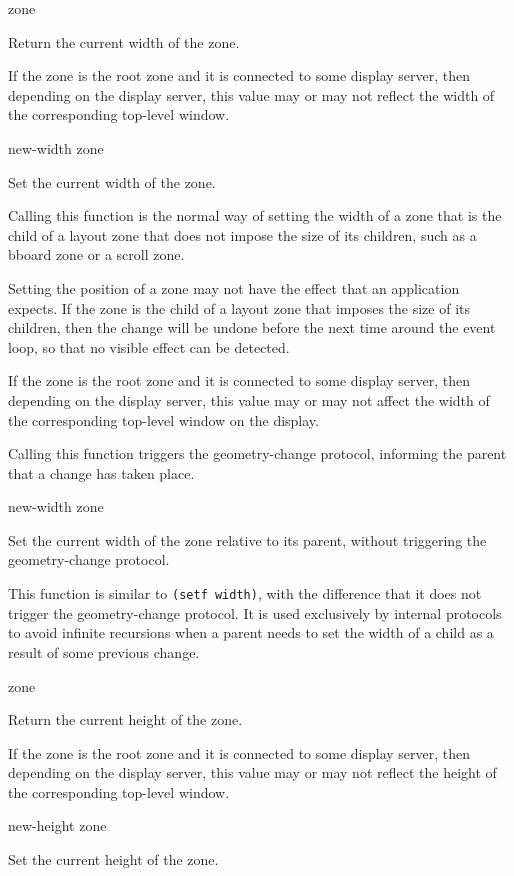  {zone}

Return the current width of the zone.  

If the zone is the root zone and it is connected to some display
server, then depending on the display server, this value may or
may not reflect the width of the corresponding top-level window.

 {new-width zone}

Set the current width of the zone.

Calling this function is the normal way of setting the width of a
zone that is the child of a layout zone that does not impose the
size of its children, such as a bboard zone or a scroll zone.

Setting the position of a zone may not have the effect that an
application expects.  If the zone is the child of a layout zone
that imposes the size of its children, then the change will be
undone before the next time around the event loop, so that no
visible effect can be detected.

If the zone is the root zone and it is connected to some display
server, then depending on the display server, this value may or
may not affect the width of the corresponding top-level window
on the display.

Calling this function triggers the geometry-change protocol,
informing the parent that a change has taken place.  

 {new-width zone}

Set the current width of the zone relative to its parent, without
triggering the geometry-change protocol.

This function is similar to \texttt{(setf width)}, with the difference
that it does not trigger the geometry-change protocol.  It is used
exclusively by internal protocols to avoid infinite recursions when a
parent needs to set the width of a child as a result of some previous
change.

 {zone}

Return the current height of the zone.

If the zone is the root zone and it is connected to some display
server, then depending on the display server, this value may or
may not reflect the height of the corresponding top-level window.

 {new-height zone}

Set the current height of the zone.

